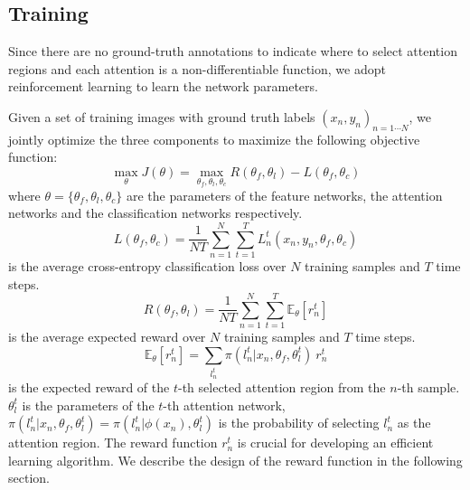 \documentclass[10pt,twocolumn,letterpaper]{article}
\begin{document}

\subsection{Training}

Since there are no ground-truth annotations to indicate where to select attention regions and each attention is a non-differentiable function, we adopt reinforcement learning to learn the network parameters.

Given a set of training images with ground truth labels $(x_n, y_n)_{n=1\cdots N}$, we jointly optimize the three components to maximize the following objective function:
\begin{equation}
\max_{\theta} J(\theta) =  \max_{\theta_f, \theta_l, \theta_c} R(\theta_f, \theta_l) - L(\theta_f, \theta_c)
\end{equation}
where $\theta = \{\theta_f, \theta_l, \theta_c\}$ are the parameters of the feature networks, the attention networks and the classification networks respectively.
\begin{equation}
L(\theta_f, \theta_c) = \frac{1}{NT} \sum_{n=1}^N \sum_{t=1}^T L^t_n(x_n, y_n, \theta_f, \theta_c)
\end{equation}
is the average cross-entropy classification loss over $N$ training samples and $T$ time steps.
\begin{equation}
R(\theta_f, \theta_l) = \frac{1}{NT} \sum_{n=1}^N \sum_{t=1}^T \mathbb{E}_{\theta}[r^t_n]
\end{equation}
is the average expected reward over $N$ training samples and $T$ time steps.
\begin{equation}
\mathbb{E}_{\theta}[r^t_n] = \sum_{l^t_n} \pi(l^t_n|x_n, \theta_f, \theta^t_l) \ r^t_n
\end{equation}
is the expected reward of the $t$-th selected attention region from the $n$-th sample.
$\theta^t_l$ is the parameters of the $t$-th attention network,
$\pi(l^t_n|x_n, \theta_f, \theta^t_l) = \pi(l^t_n|\phi(x_n), \theta^t_l)$ is the probability of selecting $l^t_n$ as the attention region.
The reward function $r^t_n$ is crucial for developing an efficient learning algorithm. We describe the design of the reward function in the following section.
\end{document}
